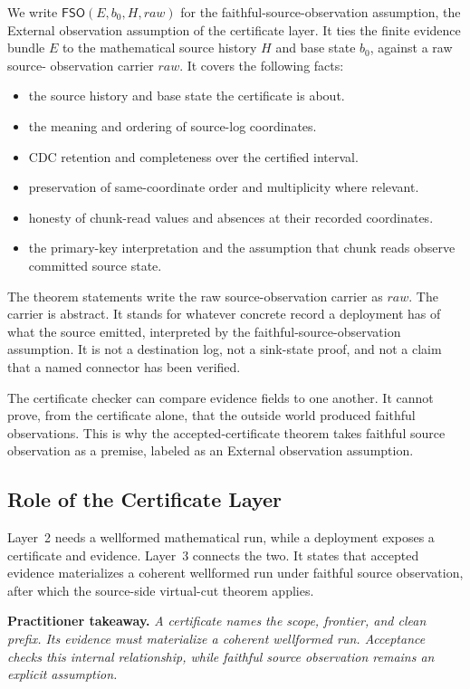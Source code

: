 \documentclass[letterpaper,10pt,twocolumn]{article}
\newcommand{\RawObs}{\mathit{raw}}
\newcommand{\FSO}{\mathsf{FSO}}
\providecommand{\tightlist}{\setlength{\itemsep}{0pt}\setlength{\parskip}{0pt}}
\begin{document}
We write $\FSO(E,b_0,H,\RawObs)$ for the faithful-source-observation
assumption, the External observation assumption of the certificate
layer. It ties the finite evidence bundle $E$ to the mathematical
source history $H$ and base state $b_0$, against a raw source-
observation carrier $\RawObs$. It covers the following facts:

\begin{itemize}\tightlist
\item the source history and base state the certificate is about.
\item the meaning and ordering of source-log coordinates.
\item CDC retention and completeness over the certified interval.
\item preservation of same-coordinate order and multiplicity where
  relevant.
\item honesty of chunk-read values and absences at their recorded
  coordinates.
\item the primary-key interpretation and the assumption that chunk
  reads observe committed source state.
\end{itemize}

The theorem statements write the raw source-observation carrier as
$\RawObs$. The carrier is abstract. It stands for whatever concrete
record a deployment has of what the source emitted, interpreted by the
faithful-source-observation assumption. It is not a destination log,
not a sink-state proof, and not a claim that a named connector has been
verified.

The certificate checker can compare evidence fields to one another. It
cannot prove, from the certificate alone, that the outside world
produced faithful observations. This is why the accepted-certificate
theorem takes faithful source observation as a premise, labeled as an
External observation assumption.

\subsection{Role of the Certificate Layer}\label{why-this-layer-exists}

Layer~2 needs a wellformed mathematical run, while a deployment exposes
a certificate and evidence. Layer~3 connects the two. It states that
accepted evidence materializes a coherent wellformed run under faithful
source observation, after which the source-side virtual-cut theorem
applies.

\smallskip
\noindent\textbf{Practitioner takeaway.} \emph{A certificate names the
scope, frontier, and clean prefix. Its evidence must materialize a
coherent wellformed run. Acceptance checks this internal relationship,
while faithful source observation remains an explicit assumption.}
\end{document}
